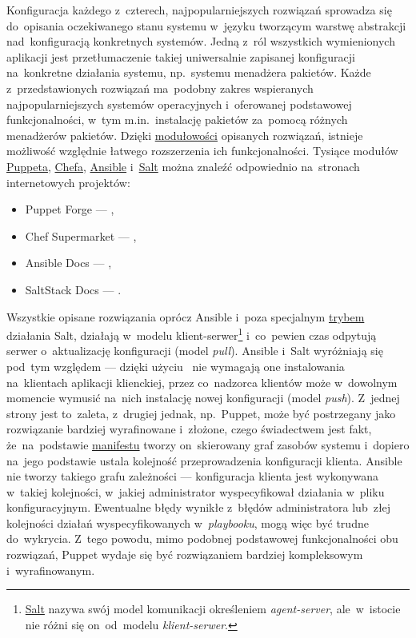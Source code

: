 \documentclass[thesis]{subfiles}
\begin{document}
Konfiguracja każdego z~czterech, najpopularniejszych rozwiązań sprowadza się do~opisania oczekiwanego stanu systemu w~języku tworzącym warstwę abstrakcji nad~konfiguracją konkretnych systemów. Jedną z~ról wszystkich wymienionych aplikacji jest przetłumaczenie takiej uniwersalnie zapisanej konfiguracji na~konkretne działania systemu, np.~systemu menadżera pakietów. Każde z~przedstawionych rozwiązań ma~podobny zakres wspieranych najpopularniejszych systemów operacyjnych i~oferowanej podstawowej funkcjonalności, w~tym m.in.~instalację pakietów za~pomocą różnych menadżerów pakietów. Dzięki \href{https://sjp.pwn.pl/poradnia/haslo/modularny-modulowy-i-nie-tylko;3162.html}{modułowości} opisanych rozwiązań, istnieje możliwość względnie łatwego rozszerzenia ich funkcjonalności. Tysiące modułów \hyperref[sec:puppet]{Puppeta}, \hyperref[sec:chef]{Chefa}, \hyperref[sec:ansible]{Ansible} i~\hyperref[sec:salt]{Salt} można znaleźć odpowiednio na~stronach internetowych projektów:\mynobreakpar
\begin{itemize}
	\item Puppet Forge --- ,
	\item Chef Supermarket --- ,
	\item Ansible Docs --- ,
	\item SaltStack Docs --- .
\end{itemize}

Wszystkie opisane rozwiązania oprócz Ansible i~poza specjalnym \href{https://docs.saltstack.com/en/latest/topics/ssh/}{trybem} działania Salt, działają w~modelu klient-serwer\footnote{\hyperref[sec:salt]{Salt} nazywa swój model komunikacji określeniem \emph{agent-server}, ale~w~istocie nie różni się on~od~modelu \emph{klient-serwer}.} i~co~pewien czas odpytują serwer o~aktualizację konfiguracji (model \emph{pull}). Ansible i~Salt wyróżniają się pod~tym względem --- dzięki użyciu~\ssh{} nie wymagają one instalowania na~klientach aplikacji klienckiej, przez co~nadzorca klientów może w~dowolnym momencie wymusić na~nich instalację nowej konfiguracji (model \emph{push}). Z~jednej strony jest to~zaleta, z~drugiej jednak, np.~Puppet, może być postrzegany jako rozwiązanie bardziej wyrafinowane i~złożone, czego świadectwem jest fakt, że~na~podstawie \hyperref[sec:puppet]{manifestu} tworzy on~skierowany graf zasobów systemu i~dopiero na~jego podstawie ustala kolejność przeprowadzenia konfiguracji klienta. Ansible nie tworzy takiego grafu zależności --- konfiguracja klienta jest wykonywana w~takiej kolejności, w~jakiej administrator wyspecyfikował działania w~pliku konfiguracyjnym. Ewentualne błędy wynikłe z~błędów administratora lub~złej kolejności działań wyspecyfikowanych w~\emph{playbooku}, mogą więc być trudne do~wykrycia. Z~tego powodu, mimo podobnej podstawowej funkcjonalności obu rozwiązań, Puppet wydaje się być rozwiązaniem bardziej kompleksowym i~wyrafinowanym.
\end{document}
